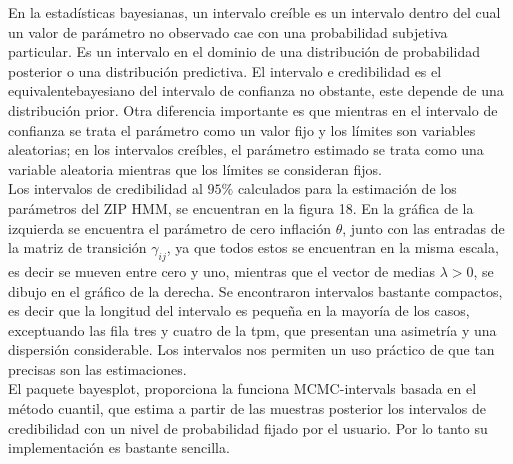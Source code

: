 \documentclass[a4paper]{article}\usepackage[]{graphicx}\usepackage[]{color}
\begin{document}
En la estadísticas bayesianas, un intervalo creíble es un intervalo dentro del cual un valor de parámetro no observado cae con una probabilidad subjetiva particular. Es un intervalo en el dominio de una distribución de probabilidad posterior o una distribución predictiva. El intervalo e credibilidad es el equivalentebayesiano del intervalo de confianza no obstante, este depende de una distribución prior. Otra diferencia importante es que mientras en el intervalo de confianza se trata el parámetro como un valor fijo y los límites son variables aleatorias; en los intervalos creíbles, el parámetro estimado se trata como una variable aleatoria mientras que los límites se consideran fijos.
\\
Los intervalos de credibilidad al $95 \%$ calculados para la estimación de los parámetros del ZIP HMM, se encuentran en la figura 18. En la gráfica de la izquierda se encuentra el parámetro de cero inflación $\theta$, junto con las entradas de la matriz de transición $\gamma_{ij}$, ya que todos estos se encuentran en la misma escala, es decir se mueven entre cero y uno, mientras que el vector de medias $\lambda > 0$, se dibujo en el gráfico de la derecha. Se encontraron intervalos bastante compactos, es decir que la longitud del intervalo es pequeña en la mayoría de los casos, exceptuando las fila tres y cuatro de la tpm, que presentan una asimetría y una dispersión considerable. Los intervalos nos permiten un uso práctico de que tan precisas son las estimaciones.
\\
El paquete bayesplot, proporciona la funciona MCMC-intervals basada en el método cuantil, que estima a partir de las muestras posterior los intervalos de credibilidad con un nivel de probabilidad fijado por el usuario. Por lo tanto su implementación es bastante sencilla.
\end{document}
